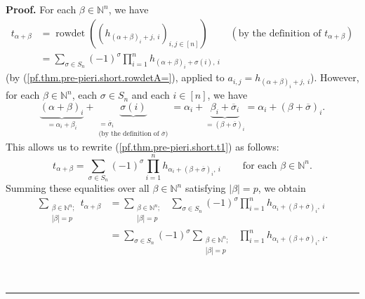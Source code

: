 \documentclass
[numbers=enddot,12pt,final,onecolumn,notitlepage,english]{scrartcl}%
\theoremstyle{definition}
\newenvironment{proof}[1][Proof]{\noindent\textbf{#1.} }{\ \rule{0.5em}{0.5em}}
\let\sumnonlimits\sum
\let\prodnonlimits\prod
\renewcommand{\sum}{\sumnonlimits\limits}
\renewcommand{\prod}{\prodnonlimits\limits}
\newenvironment{vershort}{}{}
\begin{document}
\begin{vershort}
\begin{proof}
For each $\beta\in\mathbb{N}^{n}$, we have%
\begin{align}
t_{\alpha+\beta}  &  =\operatorname*{rowdet}\left(  \left(  h_{\left(
\alpha+\beta\right)  _{i}+j,\ i}\right)  _{i,j\in\left[  n\right]  }\right)
\ \ \ \ \ \ \ \ \ \ \left(  \text{by the definition of }t_{\alpha+\beta
}\right) \nonumber\\
&  =\sum_{\sigma\in S_{n}}\left(  -1\right)  ^{\sigma}\prod_{i=1}%
^{n}h_{\left(  \alpha+\beta\right)  _{i}+\sigma\left(  i\right)  ,\ i}
\label{pf.thm.pre-pieri.short.t1}%
\end{align}
(by (\ref{pf.thm.pre-pieri.short.rowdetA=}), applied to $a_{i,j}=h_{\left(
\alpha+\beta\right)  _{i}+j,\ i}$). However, for each $\beta\in\mathbb{N}^{n}%
$, each $\sigma\in S_{n}$ and each $i\in\left[  n\right]  $, we have%
\[
\underbrace{\left(  \alpha+\beta\right)  _{i}}_{=\alpha_{i}+\beta_{i}%
}+\underbrace{\sigma\left(  i\right)  }_{\substack{=\overline{\sigma}%
_{i}\\\text{(by the definition of }\overline{\sigma}\text{)}}}=\alpha
_{i}+\underbrace{\beta_{i}+\overline{\sigma}_{i}}_{=\left(  \beta
+\overline{\sigma}\right)  _{i}}=\alpha_{i}+\left(  \beta+\overline{\sigma
}\right)  _{i}.
\]
This allows us to rewrite (\ref{pf.thm.pre-pieri.short.t1}) as follows:%
\[
t_{\alpha+\beta}=\sum_{\sigma\in S_{n}}\left(  -1\right)  ^{\sigma}\prod
_{i=1}^{n}h_{\alpha_{i}+\left(  \beta+\overline{\sigma}\right)  _{i}%
,\ i}\ \ \ \ \ \ \ \ \ \ \text{for each }\beta\in\mathbb{N}^{n}.
\]
Summing these equalities over all $\beta\in\mathbb{N}^{n}$ satisfying
$\left\vert \beta\right\vert =p$, we obtain%
\begin{align}
\sum_{\substack{\beta\in\mathbb{N}^{n};\\\left\vert \beta\right\vert
=p}}t_{\alpha+\beta}  &  =\sum_{\substack{\beta\in\mathbb{N}^{n};\\\left\vert
\beta\right\vert =p}}\ \ \sum_{\sigma\in S_{n}}\left(  -1\right)  ^{\sigma
}\prod_{i=1}^{n}h_{\alpha_{i}+\left(  \beta+\overline{\sigma}\right)
_{i},\ i}\nonumber\\
&  =\sum_{\sigma\in S_{n}}\left(  -1\right)  ^{\sigma}\sum_{\substack{\beta
\in\mathbb{N}^{n};\\\left\vert \beta\right\vert =p}}\ \ \prod_{i=1}%
^{n}h_{\alpha_{i}+\left(  \beta+\overline{\sigma}\right)  _{i},\ i}.
\label{pf.thm.pre-pieri.short.sumt=1}%
\end{align}



\end{proof}
\end{vershort}
\end{document}
